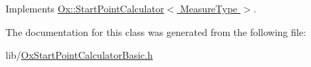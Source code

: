 Implements \hyperlink{class_ox_1_1_start_point_calculator_acd2a221872002157f232e1e7f73a1859}{Ox\+::\+Start\+Point\+Calculator$<$ Measure\+Type $>$}.



The documentation for this class was generated from the following file\+:\begin{DoxyCompactItemize}
\item 
lib/\hyperlink{_ox_start_point_calculator_basic_8h}{Ox\+Start\+Point\+Calculator\+Basic.\+h}\end{DoxyCompactItemize}
